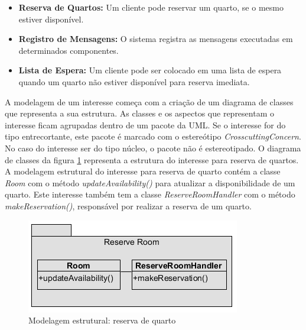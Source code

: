 \begin{itemize}
  \item \textbf{Reserva de Quartos:} Um cliente pode reservar um quarto, se o mesmo estiver disponível.
  \item \textbf{Registro de Mensagens:} O sistema registra as mensagens executadas em determinados componentes.
  \item \textbf{Lista de Espera:} Um cliente pode ser colocado em uma lista de espera quando um quarto não estiver disponível para reserva imediata.
\end{itemize}

A modelagem de um interesse começa com a criação de um diagrama de classes que representa a sua estrutura. As classes e os aspectos que
representam o interesse ficam agrupadas dentro de um pacote da UML. Se o interesse for do tipo entrecortante, este pacote é marcado com o estereótipo
\textit{CrosscuttingConcern}. No caso do interesse ser do tipo núcleo, o pacote não é estereotipado. O diagrama de classes da figura
\ref{fig:case_study_structural_reserve_room} representa a estrutura do interesse para reserva de quartos. A modelagem estrutural do interesse para 
reserva de quarto contém a classe \textit{Room} com o método \textit{updateAvailability()} para atualizar a disponibilidade de um quarto. Este
interesse também tem a classe \textit{ReserveRoomHandler} com o método \textit{makeReservation()}, responsável por realizar a reserva de um quarto.

  \begin{figure}
	\centering
	\includegraphics{img/case_study_structural_reserve_room.png}
	\caption{Modelagem estrutural: reserva de quarto}\label{fig:case_study_structural_reserve_room}
  \end{figure}

